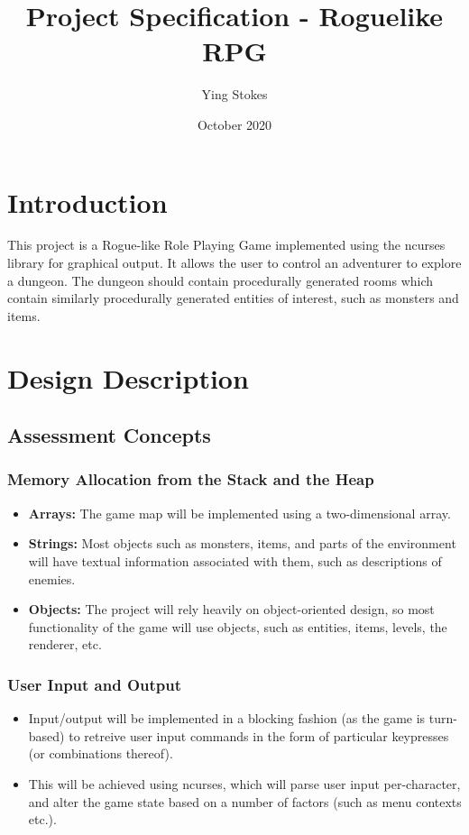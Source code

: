 \documentclass{article}
\title{Project Specification - Roguelike RPG}
\author{Ying Stokes}
\date{October 2020}
\begin{document}
\maketitle

\section{Introduction}
This project is a Rogue-like Role Playing Game implemented using the ncurses library for graphical output. It allows the user to control an adventurer to explore a dungeon. The dungeon should contain procedurally generated rooms which contain similarly procedurally generated entities of interest, such as monsters and items.

\section{Design Description}
\subsection{Assessment Concepts}
\subsubsection{Memory Allocation from the Stack and the Heap}
\begin{itemize}
    \item \textbf{Arrays:} The game map will be implemented using a two-dimensional array.
    \item \textbf{Strings:} Most objects such as monsters, items, and parts of the environment will have textual information associated with them, such as descriptions of enemies.
    \item \textbf{Objects:} The project will rely heavily on object-oriented design, so most functionality of the game will use objects, such as entities, items, levels, the renderer, etc.
\end{itemize}

\subsubsection{User Input and Output}
\begin{itemize}
    \item Input/output will be implemented in a blocking fashion (as the game is turn-based) to retreive user input commands in the form of particular keypresses (or combinations thereof).
    \item This will be achieved using ncurses, which will parse user input per-character, and alter the game state based on a number of factors (such as menu contexts etc.).
\end{itemize}
\end{document}
